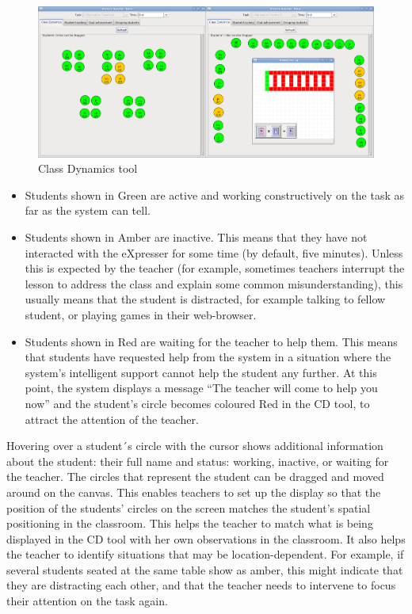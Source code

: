 \begin{figure}[hbtp]
  \centering
  \includegraphics[width=\textwidth]{gfx/ta-cd}
  \caption{Class Dynamics tool}
  \label{fig:ta-cd}
\end{figure}

\begin{itemize}
\item Students shown in Green are active and working constructively on
  the task as far as the system can tell.
\item Students shown in Amber are inactive. This means that they have
  not interacted with the eXpresser for some time (by default, five
  minutes). Unless this is expected by the teacher (for example,
  sometimes teachers interrupt the lesson to address the class and
  explain some common misunderstanding), this usually means that the
  student is distracted, for example talking to fellow student, or
  playing games in their web-browser.
\item Students shown in Red are waiting for the teacher to help
  them. This means that students have requested help from the system
  in a situation where the system’s intelligent support cannot help
  the student any further. At this point, the system displays a
  message “The teacher will come to help you now” and the student’s
  circle becomes coloured Red in the CD tool, to attract the attention
  of the teacher.
\end{itemize}

Hovering over a student´s circle with the cursor shows additional
information about the student: their full name and status: working,
inactive, or waiting for the teacher. The
circles that represent the student can be dragged and moved around on
the canvas. This enables teachers to set up the display so that the
position of the students’ circles on the screen matches the student’s
spatial positioning in the classroom. This helps the teacher to match
what is being displayed in the CD tool with her own observations in
the classroom. It also helps the teacher to identify situations that
may be location-dependent. For example, if several students seated at
the same table show as amber, this might indicate that they are
distracting each other, and that the teacher needs to intervene to
focus their attention on the task again.

